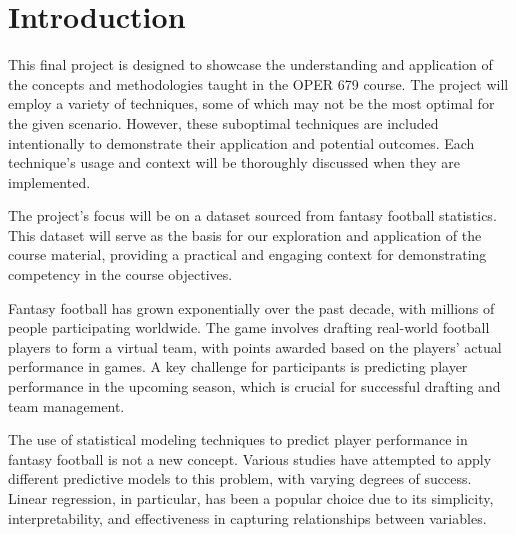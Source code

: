 \chapter{Introduction}
\label{ch:introduction}
\glsresetall

This final project is designed to showcase the understanding and application of the concepts and methodologies taught in the OPER 679 course. The project will employ a variety of techniques, some of which may not be the most optimal for the given scenario. However, these suboptimal techniques are included intentionally to demonstrate their application and potential outcomes. Each technique's usage and context will be thoroughly discussed when they are implemented.

The project's focus will be on a dataset sourced from fantasy football statistics. This dataset will serve as the basis for our exploration and application of the course material, providing a practical and engaging context for demonstrating competency in the course objectives.

Fantasy football has grown exponentially over the past decade, with millions of people participating worldwide. The game involves drafting real-world football players to form a virtual team, with points awarded based on the players' actual performance in games. A key challenge for participants is predicting player performance in the upcoming season, which is crucial for successful drafting and team management.

The use of statistical modeling techniques to predict player performance in fantasy football is not a new concept. Various studies have attempted to apply different predictive models to this problem, with varying degrees of success. Linear regression, in particular, has been a popular choice due to its simplicity, interpretability, and effectiveness in capturing relationships between variables.



